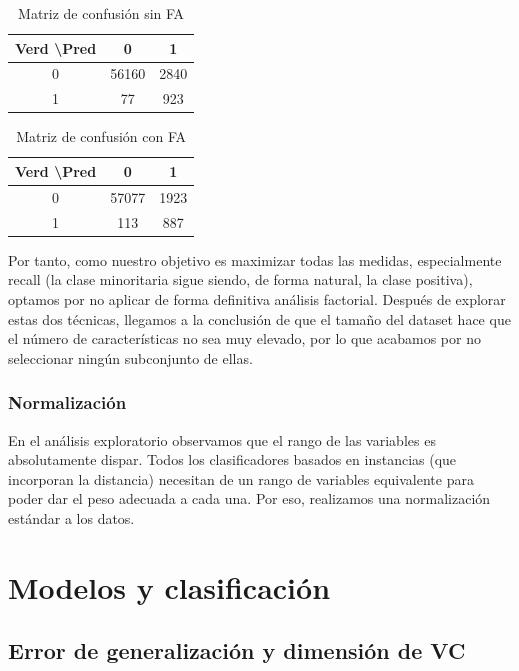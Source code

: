 \begin{table}[H]
	\centering
	\begin{tabular}{|c|c|c|}
		\hline
		Verd \textbackslash Pred & 0     & 1    \\ \hline
		0                        & 56160 & 2840 \\ \hline
		1                        & 77    & 923  \\ \hline
	\end{tabular}
	\caption{Matriz de confusión sin FA}
\end{table}

\begin{table}[H]
	\centering
	\begin{tabular}{|c|c|c|}
		\hline
		Verd \textbackslash Pred & 0     & 1    \\ \hline
		0                        & 57077 & 1923 \\ \hline
		1                        & 113   & 887  \\ \hline
	\end{tabular}
	\caption{Matriz de confusión con FA}
\end{table}

Por tanto, como nuestro objetivo es maximizar todas las medidas, especialmente recall (la clase minoritaria sigue siendo, de forma natural, la clase positiva), optamos por no aplicar de forma definitiva análisis factorial. Después de explorar estas dos técnicas, llegamos a la conclusión de que el tamaño del dataset hace que el número de características no sea muy elevado, por lo que acabamos por no seleccionar ningún subconjunto de ellas.

\subsubsection{Normalización}

En el análisis exploratorio observamos que el rango de las variables es absolutamente dispar. Todos los clasificadores basados en instancias (que incorporan la distancia) necesitan de un rango de variables equivalente para poder dar el peso adecuada a cada una. Por eso, realizamos una normalización estándar a los datos.

\section{Modelos y clasificación}

\subsection{Error de generalización y dimensión de VC}

